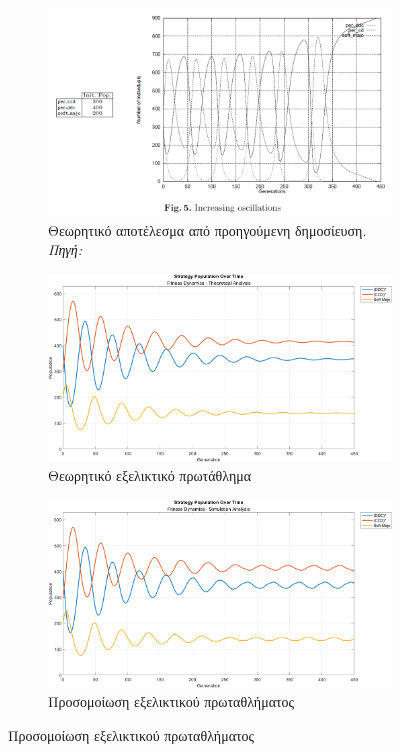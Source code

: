 \documentclass[12pt]{report}
\begin{document}
\begin{figure}[htbp]
    \centering

    \begin{subfigure}[b]{0.5\linewidth}
        \centering
        \includegraphics[width=\linewidth]{Figures Fitness Dynamics/5.png}
        \caption{Θεωρητικό αποτέλεσμα από προηγούμενη δημοσίευση. \textit{Πηγή:} \protect\cite{mathieu1999}}
        \label{fig:fig_fit_5_a}
    \end{subfigure}
    \hfill
    \begin{subfigure}[b]{0.5\linewidth}
        \centering
        \includegraphics[width=\linewidth]{Figures Fitness Dynamics/example5.png}
        \caption{Θεωρητικό εξελικτικό πρωτάθλημα}
        \label{fig:fig_fit_5_b}
    \end{subfigure}
    \hfill
    \begin{subfigure}[b]{0.5\linewidth}
        \centering
        \includegraphics[width=\linewidth]{Figures Fitness Dynamics/example5-sim.png}
        \caption{Προσομοίωση εξελικτικού πρωταθλήματος}
        \label{fig:fig_fit_5_c}
    \end{subfigure}


\end{figure}
\end{document}
